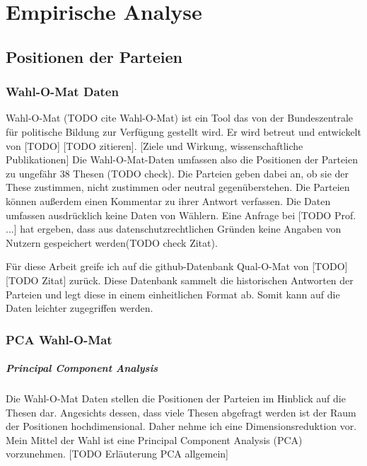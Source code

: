 
\chapter{Empirische Analyse}\label{Kap-Empirische-Analyse}

\section{Positionen der Parteien}\label{Sec-Parteienpositionen}

\subsection{Wahl-O-Mat Daten}
Wahl-O-Mat (TODO cite Wahl-O-Mat) ist ein Tool das von der Bundeszentrale für politische Bildung zur Verfügung gestellt wird. Er wird betreut und entwickelt von [TODO] [TODO zitieren].
[Ziele und Wirkung, wissenschaftliche Publikationen]
Die Wahl-O-Mat-Daten umfassen also die Positionen der Parteien zu ungefähr 38 Thesen (TODO check). Die Parteien geben dabei an, ob sie der These zustimmen, nicht zustimmen oder neutral gegenüberstehen. Die Parteien können außerdem einen Kommentar zu ihrer Antwort verfassen.
Die Daten umfassen ausdrücklich keine Daten von Wählern. Eine Anfrage bei [TODO Prof. ...] hat ergeben, dass \glqq aus datenschutzrechtlichen Gründen keine Angaben von Nutzern gespeichert werden\grqq (TODO check Zitat).

Für diese Arbeit greife ich auf die github-Datenbank Qual-O-Mat von [TODO] [TODO Zitat] zurück. Diese Datenbank sammelt die historischen Antworten der Parteien und legt diese in einem einheitlichen Format ab. Somit kann auf die Daten leichter zugegriffen werden.

\subsection{PCA Wahl-O-Mat}
\paragraph{Principal Component Analysis}
Die Wahl-O-Mat Daten stellen die Positionen der Parteien im Hinblick auf die Thesen dar. Angesichts dessen, dass viele Thesen abgefragt werden ist der Raum der Positionen hochdimensional. Daher nehme ich eine Dimensionsreduktion vor. Mein Mittel der Wahl ist eine Principal Component Analysis (PCA) vorzunehmen.
[TODO Erläuterung PCA allgemein]


